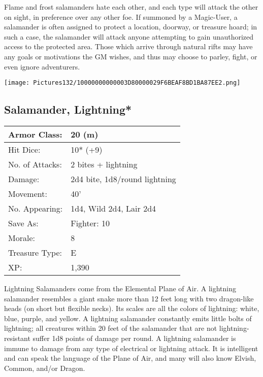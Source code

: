 \documentclass[a4paper,twoside,openany,10pt]{book}
\begin{document}
\begin{multicols}{2}
Flame and frost salamanders hate each other, and each type will attack the other on sight, in preference over any other foe. If summoned by a Magic-User, a salamander is often assigned to protect a location, doorway, or treasure hoard; in such a case, the salamander will attack anyone attempting to gain unauthorized access to the protected area. Those which arrive through natural rifts may have any goals or motivations the GM wishes, and thus may choose to parley, fight, or even ignore adventurers.

\vfill

\begin{center} \texttt{[image: Pictures132/10000000000003D80000029F6BEAF8BD1BA87EE2.png]} \end{center}


\subsection*{Salamander, Lightning*}\label{salamander-lightning}

\begin{tabularx}{0.50\textwidth}{@{}lX@{}}
Armor Class: & 20 (m) \\\hline
Hit Dice: & 10* (+9) \\\hline
No. of Attacks: & 2 bites + lightning \\\hline
Damage: & 2d4 bite, 1d8/round lightning \\\hline
Movement: & 40' \\\hline
No. Appearing: & 1d4, Wild 2d4, Lair 2d4 \\\hline
Save As: & Fighter: 10 \\\hline
Morale: & 8 \\\hline
Treasure Type: & E \\\hline
XP: & 1,390 \\\hline
\end{tabularx}\medskip

Lightning Salamanders come from the Elemental Plane of Air. A lightning salamander resembles a giant snake more than 12 feet long with two dragon-like heads (on short but flexible necks). Its scales are all the colors of lightning: white, blue, purple, and yellow. A lightning salamander constantly emits little bolts of lightning; all creatures within 20 feet of the salamander that are not lightning-resistant suffer 1d8 points of damage per round. A lightning salamander is immune to damage from any type of electrical or lightning attack. It is intelligent and can speak the language of the Plane of Air, and many will also know Elvish, Common, and/or Dragon.


\end{multicols}
\end{document}

